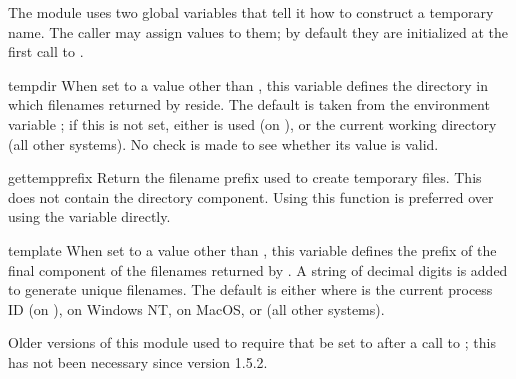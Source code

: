 The module uses two global variables that tell it how to construct a
temporary name.  The caller may assign values to them; by default they
are initialized at the first call to .

\begin{datadesc}{tempdir}
When set to a value other than , this variable defines the
directory in which filenames returned by  reside.
The default is taken from the environment variable ; if
this is not set, either  is used (on \UNIX), or the
current working directory (all other systems).  No check is made to
see whether its value is valid.
\end{datadesc}

\begin{funcdesc}{gettempprefix}{}
Return the filename prefix used to create temporary files.  This does
not contain the directory component.  Using this function is preferred
over using the  variable directly.
\end{funcdesc}

\begin{datadesc}{template}
When set to a value other than , this variable defines the
prefix of the final component of the filenames returned by
.  A string of decimal digits is added to generate
unique filenames.  The default is either  where
 is the current process ID (on \UNIX),
 on Windows NT,  on
MacOS, or  (all other systems).

Older versions of this module used to require that  be
set to  after a call to ; this has not
been necessary since version 1.5.2.
\end{datadesc}
